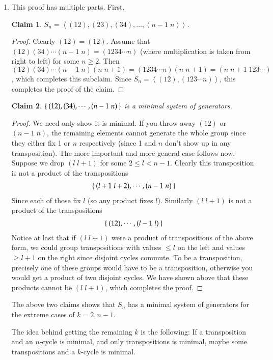 \documentclass[12pt]{article}
\theoremstyle{definitionstyle}
\newtheorem*{claim}{Claim}
\newcommand{\gen}[1]{\left\langle #1 \right\rangle}
\begin{document}
\begin{enumerate}[leftmargin=\labelsep]
\begin{enumerate}
			\item This proof has multiple parts. First,
			\begin{claim}
				$S_n = \gen{(12), (23), (34), \ldots, (n-1 \; n)}$.
			\end{claim}
			\begin{proof}
				Clearly $(12) = (12)$. Assume that $(12) (34) \cdots (n-1 \; n) = (1234 \cdots n)$ (where multiplication is taken from right to left) for some $n \geq 2$. Then $(12) (34) \cdots (n-1 \; n)(n \; n+1) = (1234 \cdots n)(n \; n+1) = (n \; n+1 \; 123 \cdots)$, which completes this subclaim. Since $S_n = \gen{(12), (123\cdots n)}$, this completes the proof of the claim.
			\end{proof}
			\begin{claim}
				$\Set{(12), (34), \cdots, (n-1 \; n)}$ is a minimal system of generators. 
			\end{claim}
			\begin{proof}
				We need only show it is minimal. If you throw away $(12)$ or $(n-1 \; n)$, the remaining elements cannot generate the whole group since they either fix 1 or $n$ respectively (since 1 and $n$ don't show up in any transposition). The more important and more general case follows now. Suppose we drop $(l \; l+1)$ for some $2 \leq l < n-1$. Clearly this transposition is not a product of the transpositions
				\begin{align*}
					\Set{(l+1 \; l+2), \cdots, (n-1 \; n)}
				\end{align*}
				Since each of those fix $l$ (so any product fixes $l$). Similarly $(l \; l+1)$ is not a product of the transpositions
				\begin{align*}
					\Set{(12), \cdots, (l-1 \; l)}
				\end{align*}
				Notice at last that if $(l \; l+1)$ were a product of transpositions of the above form, we could group transpositions with values $\leq l$ on the left and values $\geq l+1$ on the right since disjoint cycles commute. To be a transposition, precisely one of these groups would have to be a transposition, otherwise you would get a product of two disjoint cycles. We have shown above that these products cannot be $(l \; l+1)$, which completes the proof.
			\end{proof}
			The above two claims shows that $S_n$ has a minimal system of generators for the extreme cases of $k=2, n-1$. 
			
			The idea behind getting the remaining $k$ is the following: If a transposition and an $n$-cycle is minimal, and only transpositions is minimal, maybe some transpositions and a $k$-cycle is minimal.
			

\end{enumerate}
\end{enumerate}
\end{document}

